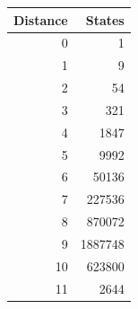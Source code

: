 \begin{tabular}{rr}
\hline
Distance & States \\
\hline
0 & 1 \\
1 & 9 \\
2 & 54 \\
3 & 321 \\
4 & 1847 \\
5 & 9992 \\
6 & 50136 \\
7 & 227536 \\
8 & 870072 \\
9 & 1887748 \\
10 & 623800 \\
11 & 2644 \\
\hline
\end{tabular}
